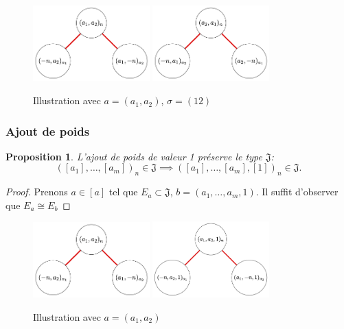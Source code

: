 \documentclass{article}
\newtheorem{proposition}{Proposition}
\newcommand{\J}{\mathfrak{J}}
\begin{document}
\begin{figure}[h]
    \caption{Illustration avec $a = (a_1, a_2)$, $\sigma = (12)$}
    \centering
    \includegraphics[width=0.4\textwidth]{abn}
    \includegraphics[width=0.4\textwidth]{ban}
\end{figure}

\subsubsection{Ajout de poids}

\begin{proposition}
    L'ajout de poids de valeur 1 préserve le type $\J$:
    \[ {([a_1], \dots, [a_m])}_n \in \J \implies {([a_1], \dots, [a_m], [1])}_n \in \J. \]
\end{proposition}

\begin{proof}
    Prenons $a \in [a]$ tel que $E_a \subset \J$, $b = (a_1, \dots, a_m, 1)$. Il suffit d'observer que $E_a \cong E_b$
\end{proof}

\begin{figure}[h]
    \caption{Illustration avec $a = (a_1, a_2)$}
    \centering
    \includegraphics[width=0.4\textwidth]{abn}
    \includegraphics[width=0.4\textwidth]{ab1n}
\end{figure}
\end{document}
